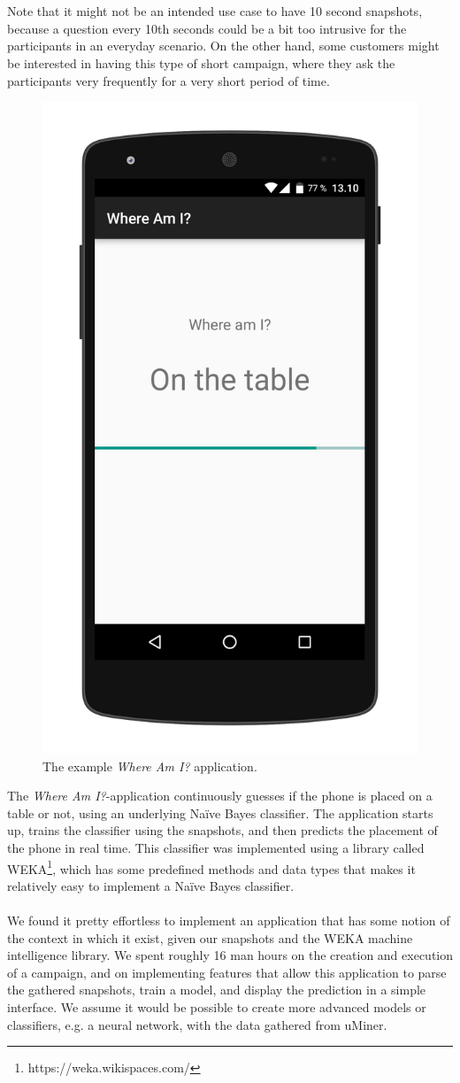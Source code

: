 \\\\
Note that it might not be an intended use case to have 10 second snapshots, because a question every 10th seconds could be a bit too intrusive for the participants in an everyday scenario. On the other hand, some customers might be interested in having this type of short campaign, where they ask the participants very frequently for a very short period of time. 

\begin{figure}[!htbp]
    \centering
    \includegraphics[width=.35\textwidth ]{graphic/quality_assurance/where_am_i_app.png}
    \caption{The example \emph{Where Am I?} application.}
    \label{fig:where_am_i_app}
\end{figure}
\FloatBarrier

The \emph{Where Am I?}-application continuously guesses if the phone is placed on a table or not, using an underlying Naïve Bayes classifier. The application starts up, trains the classifier using the snapshots, and then predicts the placement of the phone in real time. This classifier was implemented using a library called WEKA\footnote{https://weka.wikispaces.com/}, which has some predefined methods and data types that makes it relatively easy to implement a Naïve Bayes classifier.
\\\\
We found it pretty effortless to implement an application that has some notion of the context in which it exist, given our snapshots and the WEKA machine intelligence library. We spent roughly 16 man hours on the creation and execution of a campaign, and on implementing features that allow this application to parse the gathered snapshots, train a model, and display the prediction in a simple interface. We assume it would be possible to create more advanced models or classifiers, e.g. a neural network, with the data gathered from uMiner.